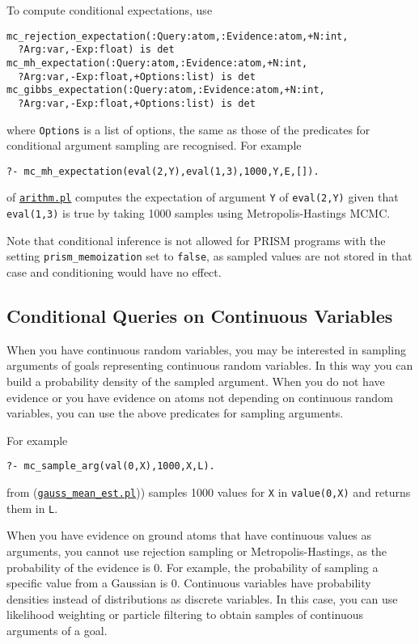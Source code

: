 To compute conditional expectations, use
\begin{verbatim}
mc_rejection_expectation(:Query:atom,:Evidence:atom,+N:int,
  ?Arg:var,-Exp:float) is det
mc_mh_expectation(:Query:atom,:Evidence:atom,+N:int,
  ?Arg:var,-Exp:float,+Options:list) is det
mc_gibbs_expectation(:Query:atom,:Evidence:atom,+N:int,
  ?Arg:var,-Exp:float,+Options:list) is det
\end{verbatim}
where \verb|Options| is a list of options, the same as those of the predicates for conditional argument 
sampling are recognised.
For example
\begin{verbatim}
?- mc_mh_expectation(eval(2,Y),eval(1,3),1000,Y,E,[]).
\end{verbatim}
of \href{http://cplint.eu/e/arithm.pl}{\texttt{arithm.pl}}
computes the expectation of argument \verb|Y| of \verb|eval(2,Y)| given that
\verb|eval(1,3)| is true by taking 1000 samples using Metropolis-Hastings MCMC.

Note that conditional inference  is not allowed for PRISM programs with the setting \verb|prism_memoization| set to
\verb|false|, as sampled values are not stored in that case and conditioning would have no effect.

\subsection{Conditional Queries on Continuous Variables}
\label{condqcont}

When you have continuous random variables, you may be interested in
sampling arguments of goals representing continuous random variables.
In this way you can build a probability density of the sampled argument.
When you do not have evidence or you have evidence on atoms not depending
on continuous random variables, you can use the above predicates for sampling
arguments.

For example
\begin{verbatim}
?- mc_sample_arg(val(0,X),1000,X,L).
\end{verbatim}
from (\href{http://cplint.eu/e/gauss_mean_est.pl}{\texttt{gauss\_mean\_est.pl}})) samples 1000 values for \verb|X| in
\verb|value(0,X)| and returns them in \verb|L|.

When you have evidence on ground atoms that have continuous values as
arguments, you cannot use rejection sampling or Metropolis-Hastings,
as the probability of the evidence is 0. For example,
the probability of sampling a specific value from a Gaussian is 0.
Continuous variables have probability densities instead of distributions as
discrete variables.
In this case, you can use likelihood weighting or particle filtering \cite{fung1990weighing,koller2009probabilistic,Nitti2016} to obtain samples of
continuous arguments of a goal.

